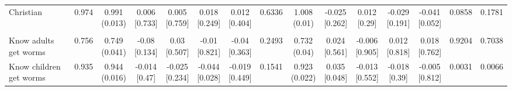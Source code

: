 \documentclass[
]{article}
\begin{document}
\begin{table}
{\begin{tabular}[t]{lcccccccccccccc}
\hspace{1em}Christian & 0.974 & \makecell[c]{0.991\\(0.013)} & \makecell[c]{0.006\\{[0.733]}} & \makecell[c]{0.005\\{[0.759]}} & \makecell[c]{0.018\\{[0.249]}} & \makecell[c]{0.012\\{[0.404]}} & 0.6336 & \makecell[c]{1.008\\(0.01)} & \makecell[c]{-0.025\\{[0.262]}} & \makecell[c]{0.012\\{[0.29]}} & \makecell[c]{-0.029\\{[0.191]}} & \makecell[c]{-0.041\\{[0.052]}} & 0.0858 & 0.1781\\
\addlinespace[0.3em]
\hline
\multicolumn{15}{l}{\textit{\textbf{Panel C: Deworming knowledge, $N=2,407$}}}\\
\hline
\hspace{1em}Know adults get worms & 0.756 & \makecell[c]{0.749\\(0.041)} & \makecell[c]{-0.08\\{[0.134]}} & \makecell[c]{0.03\\{[0.507]}} & \makecell[c]{-0.01\\{[0.821]}} & \makecell[c]{-0.04\\{[0.363]}} & 0.2493 & \makecell[c]{0.732\\(0.04)} & \makecell[c]{0.024\\{[0.561]}} & \makecell[c]{-0.006\\{[0.905]}} & \makecell[c]{0.012\\{[0.818]}} & \makecell[c]{0.018\\{[0.762]}} & 0.9204 & 0.7038\\
\hspace{1em}Know children get worms & 0.935 & \makecell[c]{0.944\\(0.016)} & \makecell[c]{-0.014\\{[0.47]}} & \makecell[c]{-0.025\\{[0.234]}} & \makecell[c]{-0.044\\{[0.028]}} & \makecell[c]{-0.019\\{[0.449]}} & 0.1541 & \makecell[c]{0.923\\(0.022)} & \makecell[c]{0.035\\{[0.048]}} & \makecell[c]{-0.013\\{[0.552]}} & \makecell[c]{-0.018\\{[0.39]}} & \makecell[c]{-0.005\\{[0.812]}} & 0.0031 & 0.0066\\

\end{tabular}}
\end{table}
\end{document}
